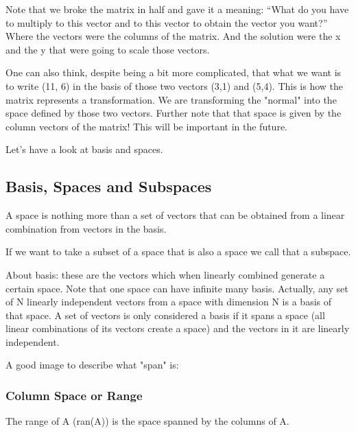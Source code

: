 \par Note that we broke the matrix in half and gave it a meaning: ``What do you have to multiply to this vector and to this vector to obtain the vector you want?'' Where the vectors were the columns of the matrix. And the solution were the x and the y that were going to scale those vectors.

\par One can also think, despite being a bit more complicated, that what we want is to write (11, 6) in the basis of those two vectors (3,1) and (5,4). This is how the matrix represents a transformation. We are transforming the "normal" into the space defined by those two vectors. Further note that that space is given by the column vectors of the matrix! This will be important in the future.
\par Let's have a look at basis and spaces.

\subsection{Basis, Spaces and Subspaces}

\par A space is nothing more than a set of vectors that can be obtained from a linear combination from vectors in the basis. 

\par If we want to take a subset of a space that is also a space we call that a subspace.

\par About basis: these are the vectors which when linearly combined generate a certain space. Note that one space can have infinite many basis. Actually, any set of N linearly independent vectors from a space with dimension N is a basis of that space. A set of vectors is only considered a basis if it spans a space (all linear combinations of its vectors create a space) and the vectors in it are linearly independent. 

\par A good image to describe what "span" is:



\subsubsection{Column Space or Range}

\par The range of A (ran(A)) is the space spanned by the columns of A.


